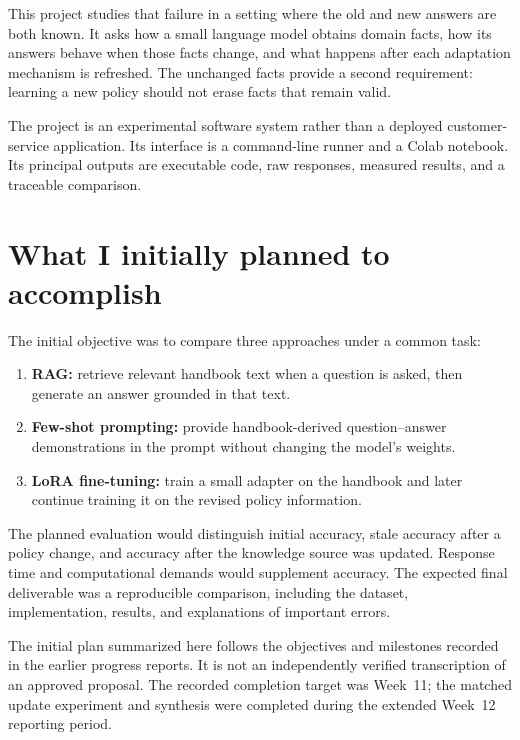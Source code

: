 \documentclass[11pt,letterpaper,oneside]{report}
\begin{document}
This project studies that failure in a setting where the old and new answers are both known. It asks how a small language model obtains domain facts, how its answers behave when those facts change, and what happens after each adaptation mechanism is refreshed. The unchanged facts provide a second requirement: learning a new policy should not erase facts that remain valid.

The project is an experimental software system rather than a deployed customer-service application. Its interface is a command-line runner and a Colab notebook. Its principal outputs are executable code, raw responses, measured results, and a traceable comparison.

\section{What I initially planned to accomplish}
The initial objective was to compare three approaches under a common task:
\begin{enumerate}
\item \textbf{RAG:} retrieve relevant handbook text when a question is asked, then generate an answer grounded in that text.
\item \textbf{Few-shot prompting:} provide handbook-derived question--answer demonstrations in the prompt without changing the model's weights.
\item \textbf{LoRA fine-tuning:} train a small adapter on the handbook and later continue training it on the revised policy information.
\end{enumerate}
The planned evaluation would distinguish initial accuracy, stale accuracy after a policy change, and accuracy after the knowledge source was updated. Response time and computational demands would supplement accuracy. The expected final deliverable was a reproducible comparison, including the dataset, implementation, results, and explanations of important errors.

The initial plan summarized here follows the objectives and milestones recorded in the earlier progress reports. It is not an independently verified transcription of an approved proposal. The recorded completion target was Week~11; the matched update experiment and synthesis were completed during the extended Week~12 reporting period.
\end{document}
